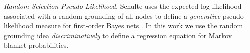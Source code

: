 \documentclass[twoside,leqno,twocolumn]{article}
\begin{document}
{\em Random Selection Pseudo-Likelihood.} Schulte uses the expected log-likelihood associated with a random grounding of all nodes to define a {\em generative} pseudo-likelihood measure for  first-order Bayes nets  \cite{Schulte2011}. 
In this work we use the random grounding idea {\em discriminatively} to define a regression equation for Markov blanket probabilities.
%
\end{document}

